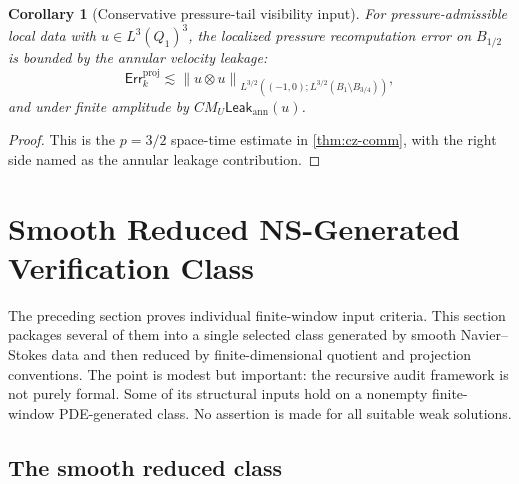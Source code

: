 \documentclass[11pt]{article}
\numberwithin{equation}{section}
\theoremstyle{plain}
\newtheorem{corollary}[theorem]{Corollary}
\theoremstyle{definition}
\theoremstyle{remark}
\newcommand{\proj}{\mathrm{proj}}
\newcommand{\Err}{\mathsf{Err}}
\newcommand{\Leak}{\mathsf{Leak}}
\newcommand{\norm}[1]{\left\lVert #1\right\rVert}
\begin{document}
\begin{corollary}[Conservative pressure-tail visibility input]\label{cor:pressure-tail-input}
For pressure-admissible local data with \(u\in L^3(Q_1)^3\), the localized
pressure recomputation error on \(B_{1/2}\) is bounded by the annular
velocity leakage:
\[
  \Err_{k}^{\proj}
  \lesssim
  \norm{u\otimes u}_{L^{3/2}((-1,0);L^{3/2}(B_1\setminus B_{3/4}))},
\]
and under finite amplitude by \(C M_U\Leak_{\mathrm{ann}}(u)\).
\end{corollary}

\begin{proof}
This is the \(p=3/2\) space-time estimate in \cref{thm:cz-comm}, with the
right side named as the annular leakage contribution.
\end{proof}


\section{Smooth Reduced NS-Generated Verification Class}

The preceding section proves individual finite-window input criteria.  This
section packages several of them into a single selected class generated by
smooth Navier--Stokes data and then reduced by finite-dimensional quotient and
projection conventions.  The point is modest but important: the recursive
audit framework is not purely formal.  Some of its structural inputs hold on a
nonempty finite-window PDE-generated class.  No assertion is made for all
suitable weak solutions.

\subsection{The smooth reduced class}
\end{document}
